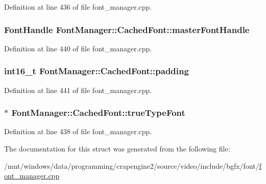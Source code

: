 Definition at line 436 of file font\+\_\+manager.\+cpp.

\hypertarget{struct_font_manager_1_1_cached_font_a14a1c176147ca21712f1ec7aac149c89}{
\subsubsection[{master\+Font\+Handle}]{\setlength{\rightskip}{0pt plus 5cm}Font\+Handle Font\+Manager\+::\+Cached\+Font\+::master\+Font\+Handle}}\label{struct_font_manager_1_1_cached_font_a14a1c176147ca21712f1ec7aac149c89}


Definition at line 440 of file font\+\_\+manager.\+cpp.

\hypertarget{struct_font_manager_1_1_cached_font_ae31ff1b08cc30df413f5bea1f376f6e0}{
\subsubsection[{padding}]{\setlength{\rightskip}{0pt plus 5cm}int16\+\_\+t Font\+Manager\+::\+Cached\+Font\+::padding}}\label{struct_font_manager_1_1_cached_font_ae31ff1b08cc30df413f5bea1f376f6e0}


Definition at line 441 of file font\+\_\+manager.\+cpp.

\hypertarget{struct_font_manager_1_1_cached_font_ae16bb9253da5738d86915ab81cda7410}{
\subsubsection[{true\+Type\+Font}]{$\ast$ Font\+Manager\+::\+Cached\+Font\+::true\+Type\+Font}}\label{struct_font_manager_1_1_cached_font_ae16bb9253da5738d86915ab81cda7410}


Definition at line 438 of file font\+\_\+manager.\+cpp.



The documentation for this struct was generated from the following file\+:\begin{DoxyCompactItemize}
\item 
/mnt/windows/data/programming/crapengine2/source/video/include/bgfx/font/\hyperlink{font__manager_8cpp}{font\+\_\+manager.\+cpp}\end{DoxyCompactItemize}
